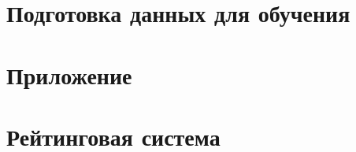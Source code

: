 \label{work}


\section{Подготовка данных для обучения}



\section{Приложение}



\section{Рейтинговая система}



















